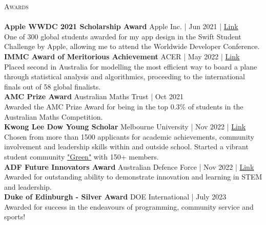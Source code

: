 \documentclass[a4paper]{article}
\newcommand{\lineunder} {
    \vspace*{-8pt} \\
    \hspace*{-18pt} \hrulefill \\
}
\newcommand{\header} [1] {
    {\hspace*{-18pt}\vspace*{6pt} \textsc{#1}}
    \vspace*{-6pt} \lineunder
}
\begin{document}
\header{Awards}
\textbf{Apple WWDC 2021 Scholarship Award} \hfill Apple Inc. | Jun 2021 | \href{https://www.wwdcscholars.com/s/DF1A5147-A993-44E4-8739-8A050139A7BA/2021}{\color{blue}Link}\\
One of 300 global students awarded for my app design in the Swift Student Challenge by Apple, allowing me to attend the Worldwide Developer Conference.\\
\vspace*{2mm}
\textbf{IMMC Award of Meritorious Achievement} \hfill ACER | May 2022 | \href{https://www.acer.org/au/discover/article/bray-park-and-caulfield-grammar-schools-top-maths-challenge}{\color{blue}Link}\\
Placed second in Australia for modelling the most efficient way to board a plane through statistical analysis and algorithmics, proceeding to the international finals out of 58 global finalists.\\
\vspace*{2mm}
\textbf{AMC Prize Award} \hfill Australian Maths Trust | Oct 2021\\
Awarded the AMC Prize Award for being in the top 0.3\% of students in the Australian Maths Competition.\\
\vspace*{2mm}
\textbf{Kwong Lee Dow Young Scholar} \hfill Melbourne University | Nov 2022 | \href{https://www.linkedin.com/posts/caulfield-grammar-school_caulfieldgrammar2022-activity-7001816876439781376-DZpH}{\color{blue}Link}\\
Chosen from more than 1500 applicants for academic achievements, community involvement and leadership skills within and outside school.
Started a vibrant student community \href{https://garv-shah.github.io/green/}{"Green"} with 150+ members.\\
\vspace*{2mm}
\textbf{ADF Future Innovators Award} \hfill Australian Defence Force | Nov 2022 | \href{https://adffutureinnovators.defencejobs.gov.au/schools/AwardsInformationSTEM.aspx}{\color{blue}Link}\\
Awarded for outstanding ability to demonstrate innovation and learning in STEM and leadership.\\
\textbf{Duke of Edinburgh - Silver Award} \hfill DOE International | July 2023\\
Awarded for success in the endeavours of programming, community service and sports!\\
\vspace*{2mm}
\end{document}
